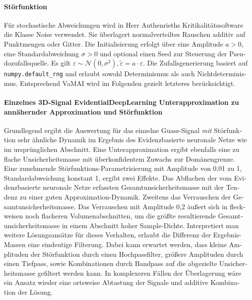 \begin{otherlanguage}{ngerman}
\paragraph{Störfunktion} Für stochastische Abweichungen wird in Herr Authenrieths Kritikalitätssoftware die Klasse Noise verwendet. Sie überlagert normalverteiltes Rauschen additiv auf Punktmengen oder Gitter. Die Initialisierung erfolgt über eine Amplitude \( a > 0 \), eine Standardabweichung \( \sigma > 0 \) und optional einen Seed zur Steuerung der Pseudozufallsquelle. Es gilt $\varepsilon \sim \mathcal{N}(0, \sigma^2), \tilde{\varepsilon} = a \cdot \varepsilon$. Die Zufallsgenerierung basiert auf \texttt{numpy.default\_rng} und erlaubt sowohl Determinismus als auch Nichtdeterminismus. Entsprechend VaMAI wird im Folgenden gezielt letzteres berücksichtigt.



\paragraph{Einzelnes 3D-Signal \gls{EvidentialDeepLearning} Unterapproximation zu annähernder Approximation und Störfunktion} 

Grundlegend ergibt die Auswertung für das einzelne Guass-Signal \textit{mit} Störfunktion sehr ähnliche Dynamik im Ergebnis des \gls{Evidenzbasierte neuronale Netze} wie im ursprünglichen Abschnitt. Eine Unterapproximation ergibt ebenfalls eine zu flache Unsicherheitsmasse mit überkonfidentem Zuwachs zur Domänengrenze. Eine zunehmende Störfunktions-Parametrisierung mit Amplitude von 0,01 zu 1, Standardabweichung konstant 1, ergibt zwei Effekte. Das Abflachen der vom \gls{Evidenzbasierte neuronale Netze} erfassten Gesamtunsicherheitsmasse mit der Tendenz zu einer guten Approximation-Dynamik. Zweitens das Verrauschen der Gesamtunsicherheitsmasse. Das Verrauschen mit Amplitude 0,2 äußert sich in fleckweisen noch flacheren Volumenabschnitten, um die größte resultierende Gesamtunsicherheitsmasse in einem Abschnitt hoher Sample-Dichte. Interpretiert man weitere Lösungsansätze für dieses Verhalten, erlaubt die Differenz der Ergebnis-Massen eine eindeutige Filterung. Dabei kann erwartet werden, dass kleine Amplituden der Störfunktion durch einen Hochpassfilter, größere Amplituden durch einen Tiefpass, sowie Kombinationen durch Bandpass auf die abgezielte Unsicherheitsmasse gefiltert werden kann. In komplexeren Fällen der Überlagerung wäre ein Ansatz wieder eine ortsweise Abtastung der Signale und additive Kombination der Lösung. 




\end{otherlanguage}
